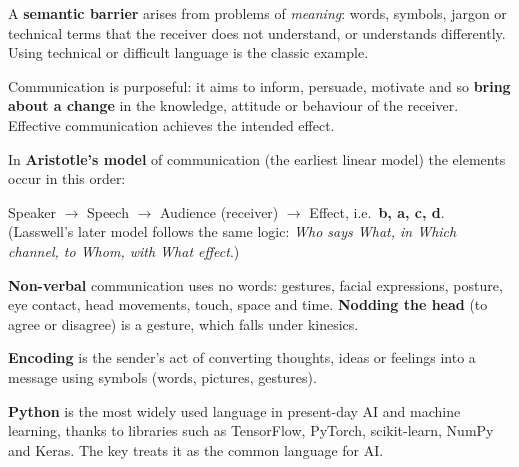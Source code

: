 A \textbf{semantic barrier} arises from problems of \emph{meaning}: words, symbols, jargon or technical terms that the receiver does not understand, or understands differently. Using technical or difficult language is the classic example.

Communication is purposeful: it aims to inform, persuade, motivate and so \textbf{bring about a change} in the knowledge, attitude or behaviour of the receiver. Effective communication achieves the intended effect.

In \textbf{Aristotle's model} of communication (the earliest linear model) the elements occur in this order:
\begin{center}
\end{center}
Speaker $\rightarrow$ Speech $\rightarrow$ Audience (receiver) $\rightarrow$ Effect, i.e.\ \textbf{b, a, c, d}. (Lasswell's later model follows the same logic: \emph{Who says What, in Which channel, to Whom, with What effect}.)

\textbf{Non-verbal} communication uses no words: gestures, facial expressions, posture, eye contact, head movements, touch, space and time. \textbf{Nodding the head} (to agree or disagree) is a gesture, which falls under kinesics.

\textbf{Encoding} is the sender's act of converting thoughts, ideas or feelings into a message using symbols (words, pictures, gestures).

\textbf{Python} is the most widely used language in present-day AI and machine learning, thanks to libraries such as TensorFlow, PyTorch, scikit-learn, NumPy and Keras. The key treats it as the common language for AI.

